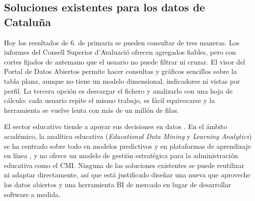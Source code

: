 \documentclass[12pt, a4paper, oneside]{report}
\begin{document}
\subsection{Soluciones existentes para los datos de Cataluña}
Hoy los resultados de 6.\textordmasculine{} de primaria se pueden consultar de tres maneras. Los informes del Consell Superior d'Avaluació \cite{csase_resultats} ofrecen agregados fiables, pero con cortes fijados de antemano que el usuario no puede filtrar ni cruzar. El visor del Portal de Datos Abiertos \cite{transparencia_catalunya_2024} permite hacer consultas y gráficos sencillos sobre la tabla plana, aunque no tiene un modelo dimensional, indicadores ni vistas por perfil. La tercera opción es descargar el fichero y analizarlo con una hoja de cálculo: cada usuario repite el mismo trabajo, es fácil equivocarse y la herramienta se vuelve lenta con más de un millón de filas.

El sector educativo tiende a apoyar sus decisiones en datos \cite{mandinach2012data}. En el ámbito académico, la analítica educativa (\textit{Educational Data Mining} y \textit{Learning Analytics}) se ha centrado sobre todo en modelos predictivos y en plataformas de aprendizaje en línea \cite{romero2010educational}, y no ofrece un modelo de gestión estratégica para la administración educativa como el CMI. Ninguna de las soluciones existentes se puede reutilizar ni adaptar directamente, así que está justificado diseñar una nueva que aproveche los datos abiertos y una herramienta BI de mercado en lugar de desarrollar software a medida.
\end{document}
